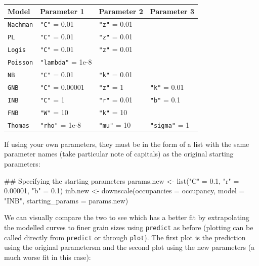 \documentclass{article}[12pt, a4paper]
\begin{document}
\begin{table}[!ht]
\centering
\begin{tabular}{| l | l | l | l |}
\hline
\textbf{Model} & \textbf{Parameter 1} &	\textbf{Parameter 2} &	\textbf{Parameter 3} \\\hline
\texttt{Nachman}  &	\texttt{"C"} = 0.01       &	\texttt{"z"} = 0.01 & \\	
\texttt{PL}       &	\texttt{"C"} = 0.01       &	\texttt{"z"} = 0.01 & \\
\texttt{Logis}    &	\texttt{"C"} = 0.01       &	\texttt{"z"} = 0.01 & \\	
\texttt{Poisson}  &	\texttt{"lambda"} = 1e-8  &  &	\\
\texttt{NB}       &	\texttt{"C"} = 0.01       &	\texttt{"k"} = 0.01 & \\	
\texttt{GNB}	    & \texttt{"C"} = 0.00001    &	\texttt{"z"} = 1    &	\texttt{"k"} = 0.01 \\
\texttt{INB}	    & \texttt{"C"} = 1          &	\texttt{"r"} = 0.01 &	\texttt{"b"} = 0.1 \\
\texttt{FNB}	    & \texttt{"W"} = 10         &	\texttt{"k"} = 10   & \\	
\texttt{Thomas}   &	\texttt{"rho"} = 1e-8     &	\texttt{"mu"} = 10  &	\texttt{"sigma"} = 1 \\\hline
\end{tabular}
\label{table:pars}
\end{table}

If using your own parameters, they must be in the form of a list with the same parameter names (take particular note of capitals) as the original starting parameters:

\begin{Schunk}
\begin{Sinput}
## Specifying the starting parameters
params.new <- list("C" = 0.1, "r" = 0.00001, "b" = 0.1)
inb.new <- downscale(occupancies = occupancy,
                     model = "INB",
                     starting_params = params.new)
\end{Sinput}
\end{Schunk}

We can visually compare the two to see which has a better fit by extrapolating the modelled curves to finer grain sizes using \texttt{predict} as before (plotting can be called directly from \texttt{predict} or through \texttt{plot}). The first plot is the prediction using the original parametersm and the second plot using the new parameters (a much worse fit in this case):
\end{document}
